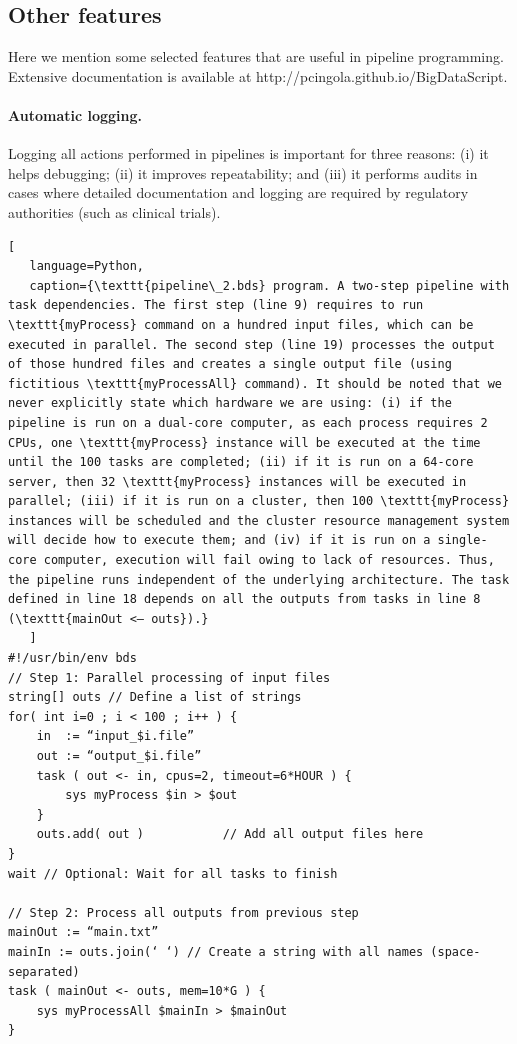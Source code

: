 \subsection{Other features}

Here we mention some selected features that are useful in pipeline programming. Extensive documentation is available at http://pcingola.github.io/BigDataScript.

\paragraph{Automatic logging.} Logging all actions performed in pipelines is important for three reasons: (i) it helps debugging; (ii) it improves repeatability; and (iii) it performs audits in cases where detailed documentation and logging are required by regulatory authorities (such as clinical trials).

\begin{lstlisting}[
   language=Python,
   caption={\texttt{pipeline\_2.bds} program. A two-step pipeline with task dependencies. The first step (line 9) requires to run \texttt{myProcess} command on a hundred input files, which can be executed in parallel. The second step (line 19) processes the output of those hundred files and creates a single output file (using fictitious \texttt{myProcessAll} command). It should be noted that we never explicitly state which hardware we are using: (i) if the pipeline is run on a dual-core computer, as each process requires 2 CPUs, one \texttt{myProcess} instance will be executed at the time until the 100 tasks are completed; (ii) if it is run on a 64-core server, then 32 \texttt{myProcess} instances will be executed in parallel; (iii) if it is run on a cluster, then 100 \texttt{myProcess} instances will be scheduled and the cluster resource management system will decide how to execute them; and (iv) if it is run on a single-core computer, execution will fail owing to lack of resources. Thus, the pipeline runs independent of the underlying architecture. The task defined in line 18 depends on all the outputs from tasks in line 8 (\texttt{mainOut <– outs}).}
   ]
#!/usr/bin/env bds
// Step 1: Parallel processing of input files
string[] outs // Define a list of strings 
for( int i=0 ; i < 100 ; i++ ) {
    in  := “input_$i.file”
    out := “output_$i.file”
    task ( out <- in, cpus=2, timeout=6*HOUR ) {
        sys myProcess $in > $out
    }
    outs.add( out )           // Add all output files here
}
wait // Optional: Wait for all tasks to finish

// Step 2: Process all outputs from previous step
mainOut := “main.txt”
mainIn := outs.join(‘ ‘) // Create a string with all names (space-separated)
task ( mainOut <- outs, mem=10*G ) {
    sys myProcessAll $mainIn > $mainOut
}
\end{lstlisting}

